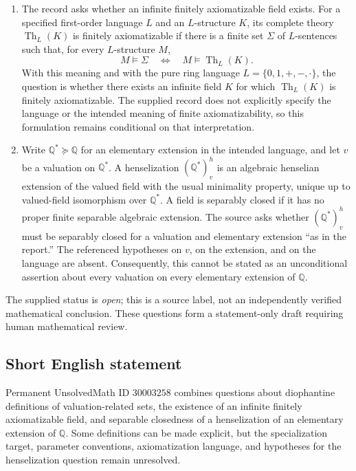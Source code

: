\documentclass[11pt]{article}
\newcommand{\Q}{\mathbb{Q}}
\begin{document}
\begin{enumerate}
\item The record asks whether an infinite finitely axiomatizable field exists. For a specified first-order language \(L\) and an \(L\)-structure \(K\), its complete theory \(\operatorname{Th}_L(K)\) is finitely axiomatizable if there is a finite set \(\Sigma\) of \(L\)-sentences such that, for every \(L\)-structure \(M\),
\[
M\models\Sigma\quad\Longleftrightarrow\quad M\models\operatorname{Th}_L(K).
\]
With this meaning and with the pure ring language \(L=\{0,1,+,-,\cdot\}\), the question is whether there exists an infinite field \(K\) for which \(\operatorname{Th}_L(K)\) is finitely axiomatizable. The supplied record does not explicitly specify the language or the intended meaning of finite axiomatizability, so this formulation remains conditional on that interpretation.

\item Write \(\Q^*\succeq\Q\) for an elementary extension in the intended language, and let \(v\) be a valuation on \(\Q^*\). A henselization \((\Q^*)^h_v\) is an algebraic henselian extension of the valued field with the usual minimality property, unique up to valued-field isomorphism over \(\Q^*\). A field is separably closed if it has no proper finite separable algebraic extension. The source asks whether \((\Q^*)^h_v\) must be separably closed for a valuation and elementary extension ``as in the report.'' The referenced hypotheses on \(v\), on the extension, and on the language are absent. Consequently, this cannot be stated as an unconditional assertion about every valuation on every elementary extension of \(\Q\).
\end{enumerate}

The supplied status is \emph{open}; this is a source label, not an independently verified mathematical conclusion. These questions form a statement-only draft requiring human mathematical review.
\subsection{Short English statement}
Permanent UnsolvedMath ID \(30003258\) combines questions about diophantine definitions of valuation-related sets, the existence of an infinite finitely axiomatizable field, and separable closedness of a henselization of an elementary extension of \(\Q\). Some definitions can be made explicit, but the specialization target, parameter conventions, axiomatization language, and hypotheses for the henselization question remain unresolved.
\end{document}
